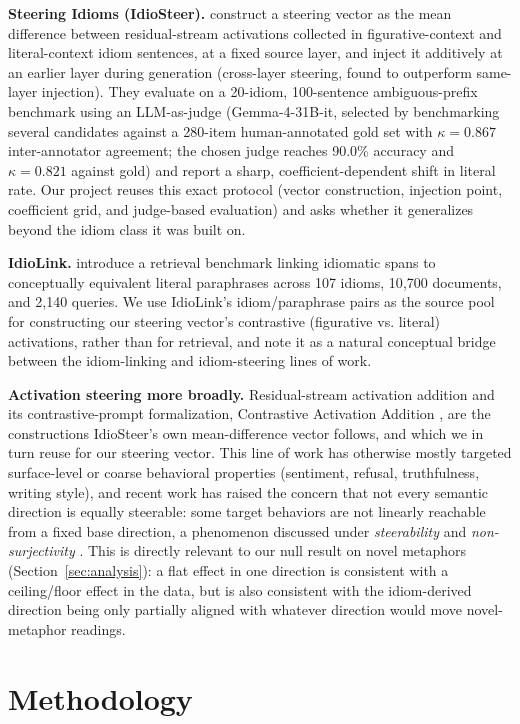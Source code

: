 \documentclass[11pt]{article}
\begin{document}
\textbf{Steering Idioms (IdioSteer).} \citet{idiosteer} construct a steering vector as the
mean difference between residual-stream activations collected in figurative-context and
literal-context idiom sentences, at a fixed source layer, and inject it additively at an
earlier layer during generation (cross-layer steering, found to outperform same-layer
injection). They evaluate on a 20-idiom, 100-sentence ambiguous-prefix benchmark using an
LLM-as-judge (Gemma-4-31B-it, selected by benchmarking several candidates against a
280-item human-annotated gold set with $\kappa=0.867$ inter-annotator agreement; the
chosen judge reaches 90.0\% accuracy and $\kappa=0.821$ against gold) and report a sharp,
coefficient-dependent shift in literal rate. Our project reuses this exact protocol
(vector construction, injection point, coefficient grid, and judge-based evaluation) and
asks whether it generalizes beyond the idiom class it was built on.

\textbf{IdioLink.} \citet{idiolink} introduce a retrieval benchmark linking idiomatic
spans to conceptually equivalent literal paraphrases across 107 idioms, 10{,}700
documents, and 2{,}140 queries. We use IdioLink's idiom/paraphrase pairs as the source
pool for constructing our steering vector's contrastive (figurative vs. literal)
activations, rather than for retrieval, and note it as a natural conceptual bridge between
the idiom-linking and idiom-steering lines of work.

\textbf{Activation steering more broadly.} Residual-stream activation addition
\citep{actadd} and its contrastive-prompt formalization, Contrastive Activation Addition
\citep{caa}, are the constructions IdioSteer's own mean-difference vector follows, and
which we in turn reuse for our steering vector. This line of work has otherwise mostly
targeted surface-level or coarse behavioral properties (sentiment, refusal, truthfulness,
writing style), and recent work has raised the concern that not every
semantic direction is equally steerable: some target behaviors are not linearly
reachable from a fixed base direction, a phenomenon discussed under \emph{steerability} and
\emph{non-surjectivity} \citep{steerability}. This is directly relevant to our null result
on novel metaphors (Section~\ref{sec:analysis}): a flat effect in one direction is
consistent with a ceiling/floor effect in the data, but is also consistent with the
idiom-derived direction being only partially aligned with whatever direction would move
novel-metaphor readings.

\section{Methodology}
\end{document}
